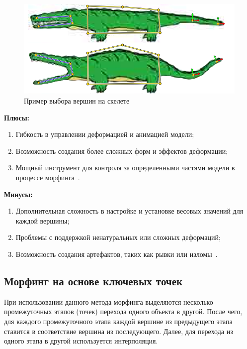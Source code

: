 \begin{figure}[H]
	\centering
	\includegraphics{images/weight_points_chosen.png}
	\caption{Пример выбора вершин на скелете}
	\label{fig:weight_points_chosen}
\end{figure}

\textbf{Плюсы:}
\begin{enumerate}
	\item Гибкость в управлении деформацией и анимацией модели;
	\item Возможность создания более сложных форм и эффектов деформации;
	\item Мощный инструмент для контроля за определенными частями модели в процессе морфинга~\cite{morphing_methods}.
\end{enumerate}

\textbf{Минусы:}
\begin{enumerate}
	\item Дополнительная сложность в настройке и установке весовых значений для каждой вершины;
	\item Проблемы с поддержкой ненатуральных или сложных деформаций;
	\item Возможность создания артефактов, таких как рывки или изломы~\cite{morphing_methods}.
\end{enumerate}

\subsection{Морфинг на основе ключевых точек}
При использовании данного метода морфинга выделяются несколько промежуточных этапов (точек) перехода одного объекта в другой. После чего, для каждого промежуточного этапа каждой вершине из предыдущего этапа ставится в соответствие вершина из последующего. 
Далее, для перехода из одного этапа в другой используется интерполяция.


